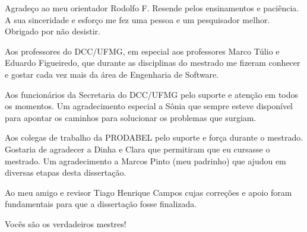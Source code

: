 Agradeço ao meu orientador Rodolfo F. Resende pelos ensinamentos e paciência. A
sua sinceridade e esforço me fez uma pessoa e um pesquisador melhor. Obrigado
por não desistir.

Aos professores do DCC/UFMG, em especial aos professores Marco Túlio e Eduardo
Figueiredo, que durante as disciplinas do mestrado me fizeram conhecer e gostar
cada vez mais da área de Engenharia de Software.

Aos funcionários da Secretaria do DCC/UFMG pelo suporte e atenção em todos os
momentos. Um agradecimento especial a Sônia  que sempre esteve disponível para
apontar os caminhos para solucionar os problemas que surgiam.

Aos colegas de trabalho da PRODABEL pelo suporte e força durante o mestrado.
Gostaria de agradecer a Dinha e Clara que permitiram que eu cursasse o
mestrado. Um agradecimento a Marcos Pinto (meu padrinho) que ajudou em diversas
etapas desta dissertação.

Ao meu amigo e revisor Tiago Henrique Campos cujas correções e apoio foram
fundamentais para que a dissertação fosse finalizada.

Vocês são os verdadeiros mestres!

